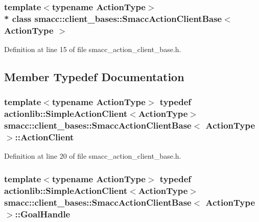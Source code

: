\subsubsection*{template$<$typename Action\+Type$>$\\*
class smacc\+::client\+\_\+bases\+::\+Smacc\+Action\+Client\+Base$<$ Action\+Type $>$}



Definition at line 15 of file smacc\+\_\+action\+\_\+client\+\_\+base.\+h.



\subsection{Member Typedef Documentation}
\subsubsection[{\texorpdfstring{Action\+Client}{ActionClient}}]{\setlength{\rightskip}{0pt plus 5cm}template$<$typename Action\+Type$>$ typedef actionlib\+::\+Simple\+Action\+Client$<$Action\+Type$>$ {\bf smacc\+::client\+\_\+bases\+::\+Smacc\+Action\+Client\+Base}$<$ Action\+Type $>$\+::{\bf Action\+Client}}\hypertarget{classsmacc_1_1client__bases_1_1SmaccActionClientBase_ab4cb0717885b95d577f82f4133db7f5f}{}\label{classsmacc_1_1client__bases_1_1SmaccActionClientBase_ab4cb0717885b95d577f82f4133db7f5f}


Definition at line 20 of file smacc\+\_\+action\+\_\+client\+\_\+base.\+h.

\subsubsection[{\texorpdfstring{Goal\+Handle}{GoalHandle}}]{\setlength{\rightskip}{0pt plus 5cm}template$<$typename Action\+Type$>$ typedef actionlib\+::\+Simple\+Action\+Client$<$Action\+Type$>$ {\bf smacc\+::client\+\_\+bases\+::\+Smacc\+Action\+Client\+Base}$<$ Action\+Type $>$\+::{\bf Goal\+Handle}}\hypertarget{classsmacc_1_1client__bases_1_1SmaccActionClientBase_a43e1a844615218b95151d456eb32b835}{}\label{classsmacc_1_1client__bases_1_1SmaccActionClientBase_a43e1a844615218b95151d456eb32b835}


